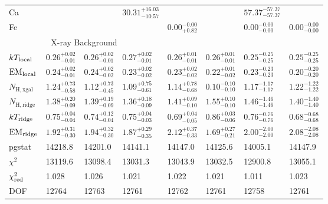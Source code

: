 \begin{tabular}{@{}llllllll@{}}
Ca &      &      & ${30.31}^{+16.03}_{-10.57}$ &      &      & ${57.37}^{-57.37}_{-57.37}$ &      \\ [0.5 em]
Fe &      &      &      & ${0.00}^{-0.00}_{+0.82}$ &      & ${0.00}^{-0.00}_{-0.00}$ & ${0.00}^{-0.00}_{-0.00}$ \\
\midrule
\multicolumn{4}{c}{X-ray Background} \\
\midrule
$k T_{\mathrm{local}}$ & ${0.26}^{+0.02}_{-0.01}$ & ${0.26}^{+0.02}_{-0.01}$ & ${0.27}^{+0.02}_{-0.01}$ & ${0.26}^{+0.01}_{-0.01}$ & ${0.26}^{+0.01}_{-0.01}$ & ${0.25}^{-0.25}_{-0.25}$ & ${0.25}^{-0.25}_{-0.25}$ \\ [0.5 em]
$\mathrm{EM}_{\mathrm{local}}$ & ${0.24}^{+0.02}_{-0.01}$ & ${0.24}^{+0.02}_{-0.02}$ & ${0.23}^{+0.02}_{-0.02}$ & ${0.23}^{+0.02}_{-0.02}$ & ${0.22}^{+0.01}_{-0.02}$ & ${0.23}^{-0.23}_{-0.23}$ & ${0.20}^{-0.20}_{-0.20}$ \\ [0.5 em]
$N_{\mathrm{H,xgal}}$ & ${1.24}^{+0.73}_{-0.58}$ & ${1.12}^{+0.73}_{-0.45}$ & ${1.09}^{+0.75}_{-0.61}$ & ${1.14}^{+0.78}_{-0.68}$ & ${0.10}^{-0.10}_{-0.10}$ & ${1.17}^{-1.17}_{-1.17}$ & ${1.22}^{-1.22}_{-1.22}$ \\ [0.5 em]
$N_{\mathrm{H,ridge}}$ & ${1.38}^{+0.20}_{-0.09}$ & ${1.39}^{+0.19}_{-0.09}$ & ${1.36}^{+0.18}_{-0.09}$ & ${1.41}^{+0.09}_{-0.10}$ & ${1.55}^{+0.10}_{-0.10}$ & ${1.46}^{-1.46}_{-1.46}$ & ${1.40}^{-1.40}_{-1.40}$ \\ [0.5 em]
$k T_{\mathrm{ridge}}$ & ${0.75}^{+0.04}_{-0.04}$ & ${0.74}^{+0.12}_{-0.04}$ & ${0.75}^{+0.04}_{-0.03}$ & ${0.69}^{+0.04}_{-0.05}$ & ${0.86}^{+0.03}_{-0.06}$ & ${0.76}^{-0.76}_{-0.76}$ & ${0.68}^{-0.68}_{-0.68}$ \\ [0.5 em]
$\mathrm{EM}_{\mathrm{ridge}}$ & ${1.92}^{+0.31}_{-0.30}$ & ${1.94}^{+0.32}_{-0.30}$ & ${1.87}^{+0.29}_{-0.35}$ & ${2.12}^{+0.37}_{-0.33}$ & ${1.69}^{+0.27}_{-0.21}$ & ${2.00}^{-2.00}_{-2.00}$ & ${2.08}^{-2.08}_{-2.08}$ \\
\midrule
pgstat & 14218.8 & 14201.0 & 14141.1 & 14147.0 & 14125.6 & 14005.1 & 14147.9 \\
$\chi^2$ & 13119.6 & 13098.4 & 13031.3 & 13043.9 & 13032.5 & 12900.8 & 13055.1 \\
$\chi^2_{\mathrm{red}}$ & 1.028 & 1.026 & 1.021 & 1.022 & 1.021 & 1.011 & 1.023 \\
DOF & 12764 & 12763 & 12761 & 12762 & 12761 & 12758 & 12761 \\
\bottomrule
\end{tabular}



